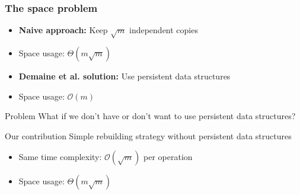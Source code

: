 \documentclass[fleqn]{beamer}
\newcommand{\Oh}{\mathcal{O}}
\begin{document}
\begin{frame}
    \frametitle{The space problem}
    
    \begin{itemize}
    \item \textbf{Naive approach:} Keep $\sqrt{m}$ independent copies \vfill
    \item Space usage: $\Theta(m\sqrt{m})$ \vfill\pause
    \item \textbf{Demaine et al. solution:} Use persistent data structures \vfill
    \item Space usage: $\Oh(m)$ \vfill\pause
    \end{itemize}
    
    \begin{alertblock}{Problem}
        What if we don't have or don't want to use persistent data structures?
    \end{alertblock} \pause
    
    \begin{block}{Our contribution}
        Simple rebuilding strategy without persistent data structures
        \begin{itemize}
        \item Same time complexity: $\Oh(\sqrt{m})$ per operation
        \item Space usage: $\Theta(m\sqrt{m})$
        \end{itemize}
    \end{block}
\end{frame}
\end{document}
